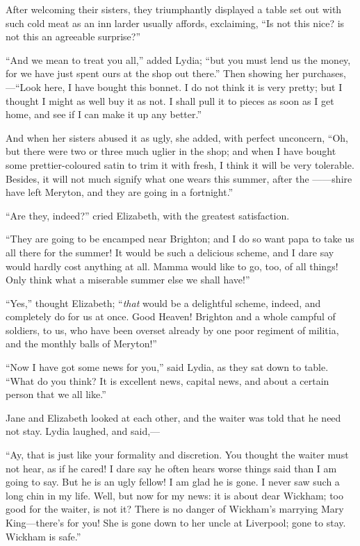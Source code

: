 \documentclass[12pt]{book}
\begin{document}
After welcoming their sisters, they triumphantly displayed a table set out with such cold meat as an inn larder usually affords, exclaiming, ``Is not this nice? is not this an agreeable surprise?''

``And we mean to treat you all,'' added Lydia; ``but you must lend us the money, for we have just spent ours at the shop out there.'' Then showing her purchases,---``Look here, I have bought this bonnet. I do not think it is very pretty; but I thought I might as well buy it as not. I shall pull it to pieces as soon as I get home, and see if I can make it up any better.''

And when her sisters abused it as ugly, she added, with perfect unconcern, ``Oh, but there were two or three much uglier in the shop; and when I have bought some prettier-coloured satin to trim it with fresh, I think it will be very tolerable. Besides, it will not much signify what one wears this summer, after the ------shire have left Meryton, and they are going in a fortnight.''

``Are they, indeed?'' cried Elizabeth, with the greatest satisfaction.

``They are going to be encamped near Brighton; and I do so want papa to take us all there for the summer! It would be such a delicious scheme, and I dare say would hardly cost anything at all. Mamma would like to go, too, of all things! Only think what a miserable summer else we shall have!''

``Yes,'' thought Elizabeth; ``\textit{that} would be a delightful scheme, indeed, and completely do for us at once. Good Heaven! Brighton and a whole campful of soldiers, to us, who have been overset already by one poor regiment of militia, and the monthly balls of Meryton!''

``Now I have got some news for you,'' said Lydia, as they sat down to table. ``What do you think? It is excellent news, capital news, and about a certain person that we all like.''

Jane and Elizabeth looked at each other, and the waiter was told that he need not stay. Lydia laughed, and said,---

``Ay, that is just like your formality and discretion. You thought the waiter must not hear, as if he cared! I dare say he often hears worse things said than I am going to say. But he is an ugly fellow! I am glad he is gone. I never saw such a long chin in my life. Well, but now for my news: it is about dear Wickham; too good for the waiter, is not it? There is no danger of Wickham's marrying Mary King---there's for you! She is gone down to her uncle at Liverpool; gone to stay. Wickham is safe.''
\end{document}

